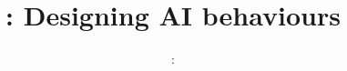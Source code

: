 
\usepackage{../../beamerthemeFalmouthGamesAcademy}
\usepackage{multimedia}
\graphicspath{ {../../} }

\lstset{language=[Sharp]C
}

\usepackage[normalem]{ulem}
\usepackage{wasysym}

\usepackage{algpseudocode}

\usepackage{pdfpages}

\usetikzlibrary{arrows,automata}

\usepackage{qtree}




\title{\sessionnumber: Designing AI behaviours}
\subtitle{\modulecode: \moduletitle}

\frame{\titlepage} 



%



